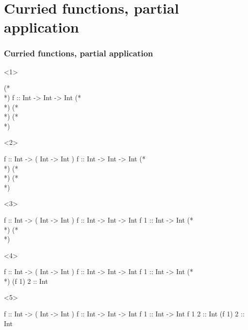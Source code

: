 \documentclass[17pt]{beamer}
\renewcommand{\(}[1]{\begin{columns}[#1]}
\renewcommand{\)}{\end{columns}}
\newcommand{\<}[1]{\begin{column}{#1}}
\renewcommand{\>}{\end{column}}
\begin{document}
\section{Curried functions, partial application}

\begin{frame}[fragile]
  \frametitle{Curried functions, partial application}
  \begin{onlyenv}<1>
    \begin{code}
(*\\*)
 f      :: Int ->   Int -> Int
(*\\*)
(*\\*)
(*\\*)
    \end{code}
  \end{onlyenv}
  \begin{onlyenv}<2>
    \begin{code}
 f      :: Int -> ( Int -> Int )
 f      :: Int ->   Int -> Int
(*\\*)
(*\\*)
(*\\*)
    \end{code}
  \end{onlyenv}
  \begin{onlyenv}<3>
    \begin{code}
 f      :: Int -> ( Int -> Int )
 f      :: Int ->   Int -> Int
 f 1    ::          Int -> Int
(*\\*)
(*\\*)
    \end{code}
  \end{onlyenv}
  \begin{onlyenv}<4>
    \begin{code}
 f      :: Int -> ( Int -> Int )
 f      :: Int ->   Int -> Int
 f 1    ::          Int -> Int
(*\\*)
(f 1) 2 ::                 Int
    \end{code}
  \end{onlyenv}
  \begin{onlyenv}<5>
    \begin{code}
 f      :: Int -> ( Int -> Int )
 f      :: Int ->   Int -> Int
 f 1    ::          Int -> Int
 f 1  2 ::                 Int
(f 1) 2 ::                 Int
    \end{code}
  \end{onlyenv}
\end{frame}
\end{document}
